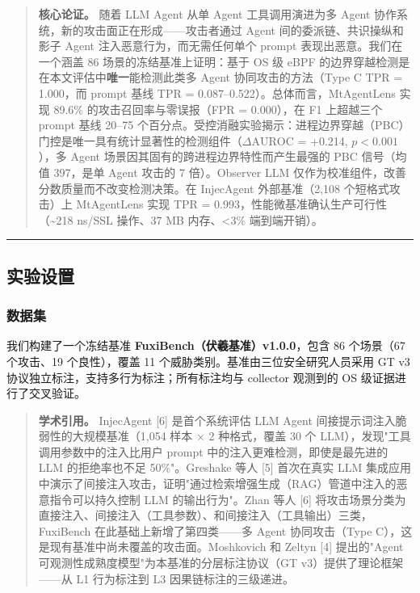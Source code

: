 \documentclass[a4paper]{ctexart}
\makeatletter
\renewcommand{\_}{%
  \ifmmode
    \nfss@text{\textunderscore}%
  \else
    \textunderscore\discretionary{}{}{}%
  \fi}
\makeatother
\begin{document}
\begin{quote}
\textbf{核心论证。} 随着 LLM Agent 从单 Agent 工具调用演进为多 Agent 协作系统，新的攻击面正在形成——攻击者通过 Agent 间的委派链、共识操纵和影子 Agent 注入恶意行为，而无需任何单个 prompt 表现出恶意。我们在一个涵盖 86 场景的冻结基准上证明：基于 OS 级 eBPF 的边界穿越检测是在本文评估中\textbf{唯一}能检测此类多 Agent 协同攻击的方法（Type C TPR = 1.000，而 prompt 基线 TPR = 0.087–0.522）。总体而言，MtAgentLens 实现 89.6\% 的攻击召回率与零误报（FPR = 0.000），在 F1 上超越三个 prompt 基线 20–75 个百分点。受控消融实验揭示：进程边界穿越（PBC）门控是唯一具有统计显著性的检测组件（$\Delta\text{AUROC}$ = +0.214, $p < 0.001$），多 Agent 场景因其固有的跨进程边界特性而产生最强的 PBC 信号（均值 397，是单 Agent 攻击的 7 倍）。Observer LLM 仅作为校准组件，改善分数质量而不改变检测决策。在 InjecAgent 外部基准（2,108 个短格式攻击）上 MtAgentLens 实现 TPR = 0.993，性能微基准确认生产可行性（\textasciitilde{}218 ns/SSL 操作、37 MB 内存、<3\% 端到端开销）。

\end{quote}


\bigskip
\hrule
\bigskip


\subsection{实验设置}



\subsubsection{数据集}



我们构建了一个冻结基准 \textbf{FuxiBench（伏羲基准）v1.0.0}，包含 86 个场景（67 个攻击、19 个良性），覆盖 11 个威胁类别。基准由三位安全研究人员采用 GT v3 协议独立标注，支持多行为标注；所有标注均与 collector 观测到的 OS 级证据进行了交叉验证。


\begin{quote}
\textbf{学术引用。} InjecAgent [6] 是首个系统评估 LLM Agent 间接提示词注入脆弱性的大规模基准（1,054 样本 × 2 种格式，覆盖 30 个 LLM），发现"工具调用参数中的注入比用户 prompt 中的注入更难检测，即使是最先进的 LLM 的拒绝率也不足 50\%"。Greshake 等人 [5] 首次在真实 LLM 集成应用中演示了间接注入攻击，证明"通过检索增强生成（RAG）管道中注入的恶意指令可以持久控制 LLM 的输出行为"。Zhan 等人 [6] 将攻击场景分类为直接注入、间接注入（工具参数）、和间接注入（工具输出）三类，FuxiBench 在此基础上新增了第四类——多 Agent 协同攻击（Type C），这是现有基准中尚未覆盖的攻击面。Moshkovich 和 Zeltyn [4] 提出的"Agent 可观测性成熟度模型"为本基准的分层标注协议（GT v3）提供了理论框架——从 L1 行为标注到 L3 因果链标注的三级递进。

\end{quote}
\end{document}
